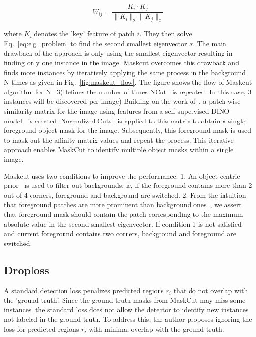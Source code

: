 \begin{equation}
W_{ij} = \frac{K_i \cdot K_j}{\|K_i\|_2 \|K_j\|_2}
\end{equation}

where \( K_i \) denotes the 'key' feature of patch \( i \). They then solve Eq.~\ref{eq:eig_problem} to find the second smallest eigenvector \( x \). The main drawback of the approach is only using the smallest eigenvector resulting in finding only one instance in the image. Maskcut overcomes this drawback and finds more instances by iteratively applying the same process in the background N times as given in Fig.~\ref{fig:maskcut_flow}. The figure shows the flow of Maskcut algorithm for N=3(Defines the number of times NCut~\cite{normcut} is repeated. In this case, 3 instances will be discovered per image) Building on the work of~\cite{wang2023tokencutsegmentingobjectsimages, caron2021emergingpropertiesselfsupervisedvision}, a patch-wise similarity matrix for the image using features from a self-supervised DINO model~\cite{caron2021emerging} is created. Normalized Cuts~\cite{normcut} is applied to this matrix to obtain a single foreground object mask for the image. Subsequently, this foreground mask is used to mask out the affinity matrix values and repeat the process. This iterative approach enables MaskCut to identify multiple object masks within a single image.

Maskcut uses two conditions to improve the performance.  1. An object centric prior~\cite{obj_centric_prior} is used to filter out backgrounds. ie, if the foreground contains more than 2 out of 4 corners, foreground and background are switched. 2. From the intuition that foreground patches are more prominent than background ones~\cite{caron2021emergingpropertiesselfsupervisedvision, cond1_support_2}, we assert that foreground mask should contain the patch corresponding to the maximum absolute value in the second smallest eigenvector. If condition 1 is not satisfied and current foreground contains two corners, background and foreground are switched.

\subsection{Droploss}
A standard detection loss penalizes predicted regions \( r_i \) that do not overlap with the 'ground truth'. Since the ground truth masks from MaskCut may miss some instances, the standard loss does not allow the detector to identify new instances not labeled in the ground truth. To address this, the author proposes ignoring the loss for predicted regions \( r_i \) with minimal overlap with the ground truth.

